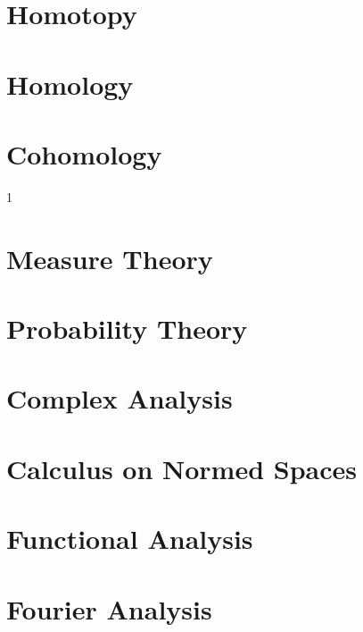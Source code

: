 \documentclass{book}                                                           %
\newcommand*{\TOPPATH}{books}
\newcommand*{\PATH}{\TOPPATH/}
\newcounter{endpage}
\def\compileanalysis{1}
\begin{document}
            \part{Homotopy}
                
            \part{Homology}
            \part{Cohomology}
        \clearpage
        \setcounter{endpage}{\thepage}
    \fi

    \if\compileanalysis1
            \label{book:Analysis}%
            \renewcommand{\PATH}{\TOPPATH/Analysis}
            \setcounter{page}{\value{endpage}}
            \part{Measure Theory}
                
            \part{Probability Theory}
                
            \part{Complex Analysis}
                
            \part{Calculus on Normed Spaces}
                
            \part{Functional Analysis}
                
            \part{Fourier Analysis}
                
                
\end{document}
